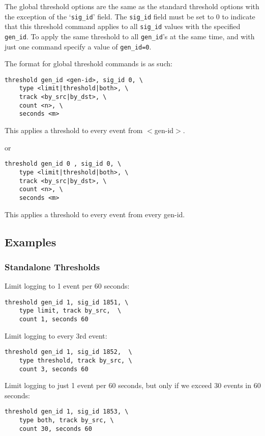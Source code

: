 \documentclass[english]{report}
\begin{document}
The global threshold options are the same as the standard threshold options
with the exception of the `\texttt{sig\_id}' field.  The \texttt{sig\_id} field must be set to 0 to
indicate that this threshold command applies to all \texttt{sig\_id} values with the specified
\texttt{gen\_id}. To apply the same threshold to all \texttt{gen\_id}'s at the same time, and with
just one command specify a value of \texttt{gen\_id=0}.

The format for global threshold commands is as such:

\begin{verbatim}
threshold gen_id <gen-id>, sig_id 0, \
    type <limit|threshold|both>, \
    track <by_src|by_dst>, \
    count <n>, \
    seconds <m>  
\end{verbatim}

This applies a threshold to every event from $<$gen-id$>$.

or 

\begin{verbatim}
threshold gen_id 0 , sig_id 0, \
    type <limit|threshold|both>, \
    track <by_src|by_dst>, \
    count <n>, \
    seconds <m>
\end{verbatim}

This applies a threshold to every event from every gen-id. 

\subsection{Examples}
\subsubsection{Standalone Thresholds}

Limit logging to 1 event per 60 seconds:
\begin{verbatim}
threshold gen_id 1, sig_id 1851, \
    type limit, track by_src,  \
    count 1, seconds 60
\end{verbatim}

Limit logging to every 3rd event:
\begin{verbatim}
threshold gen_id 1, sig_id 1852,  \
    type threshold, track by_src, \
    count 3, seconds 60
\end{verbatim}

Limit logging to just 1 event per 60 seconds, but only if we exceed 30 events in 60 seconds:
\begin{verbatim}
threshold gen_id 1, sig_id 1853, \
    type both, track by_src, \
    count 30, seconds 60
\end{verbatim}
\end{document}
